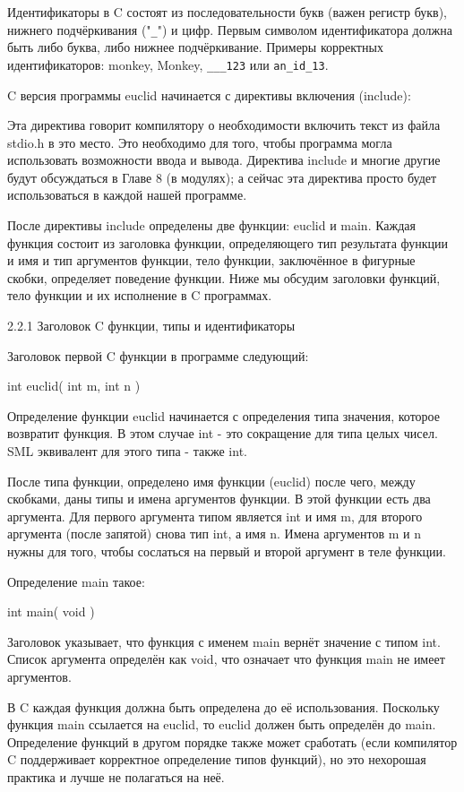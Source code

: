 Идентификаторы в C состоят из последовательности букв (важен регистр букв), нижнего подчёркивания ("\lstinline|_|") и цифр. Первым символом идентификатора должна быть либо буква, либо нижнее подчёркивание. Примеры корректных идентификаторов: monkey, Monkey, \lstinline|___123| или \lstinline|an_id_13|.

C версия программы euclid начинается с директивы включения (include):

Эта директива говорит компилятору о необходимости включить текст из файла stdio.h в это место. Это необходимо для того, чтобы программа могла использовать возможности ввода и вывода. Директива include и многие другие будут обсуждаться в Главе 8 (в модулях); а сейчас эта директива просто будет использоваться в каждой нашей программе.

После директивы include определены две функции: euclid и main. Каждая функция состоит из заголовка функции, определяющего тип результата функции и имя и тип аргументов функции, тело функции, заключённое в фигурные скобки, определяет поведение функции. Ниже мы обсудим заголовки функций, тело функции и их исполнение в C программах.

2.2.1 Заголовок C функции, типы и идентификаторы

Заголовок первой C функции в программе следующий:

int euclid( int m, int n )

Определение функции euclid начинается с определения типа значения, которое возвратит функция. В этом случае int - это сокращение для типа целых чисел. SML эквивалент для этого типа - также int.

После типа функции, определено имя функции (euclid) после чего, между скобками, даны типы и имена аргументов функции. В этой функции есть два аргумента. Для первого аргумента типом является int и имя m, для второго аргумента (после запятой) снова тип int, а имя n. Имена аргументов m и n нужны для того, чтобы сослаться на первый и второй аргумент в теле функции.

Определение main такое:

int main( void )

Заголовок указывает, что функция с именем main вернёт значение с типом int. Список аргумента определён как void, что означает что функция main не имеет аргументов.

В C каждая функция должна быть определена до её использования. Поскольку функция main ссылается на euclid, то euclid должен быть определён до main. Определение функций в другом порядке также может сработать (если компилятор C поддерживает корректное определение типов функций), но это нехорошая практика и лучше не полагаться на неё.

